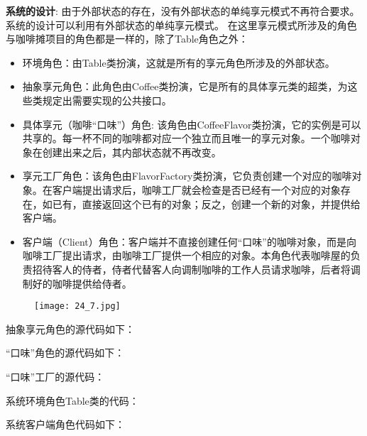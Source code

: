 \documentclass[../main.tex]{subfiles}
\begin{document}
\textbf{系统的设计}:
由于外部状态的存在，没有外部状态的单纯享元模式不再符合要求。系统的设计可以利用有外部状态的单纯享元模式。
在这里享元模式所涉及的角色与咖啡摊项目的角色都是一样的，除了Table角色之外：
\begin{itemize}
  \item 环境角色：由Table类扮演，这就是所有的享元角色所涉及的外部状态。
  \item 抽象享元角色：此角色由Coffee类扮演，它是所有的具体享元类的超类，为这些类规定出需要实现的公共接口。
  \item 具体享元（咖啡“口味”）角色: 该角色由CoffeeFlavor类扮演，它的实例是可以共享的。每一杯不同的咖啡都对应一个独立而且唯一的享元对象。一个咖啡对象在创建出来之后，其内部状态就不再改变。
  \item 享元工厂角色：该角色由FlavorFactory类扮演，它负责创建一个对应的咖啡对象。在客户端提出请求后，咖啡工厂就会检查是否已经有一个对应的对象存在，如已有，直接返回这个已有的对象；反之，创建一个新的对象，并提供给客户端。
  \item 客户端（Client）角色：客户端并不直接创建任何“口味”的咖啡对象，而是向咖啡工厂提出请求，由咖啡工厂提供一个相应的对象。本角色代表咖啡屋的负责招待客人的侍者，侍者代替客人向调制咖啡的工作人员请求咖啡，后者将调制好的咖啡提供给侍者。
\end{itemize}
%
\begin{figure}[H]
  \texttt{[image: 24\_7.jpg]}
\end{figure}
%
抽象享元角色的源代码如下：
%

%
“口味”角色的源代码如下：
%

%
“口味”工厂的源代码：
%

%
系统环境角色Table类的代码：
%

%
系统客户端角色代码如下：
%

%
\end{document}

